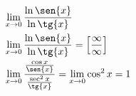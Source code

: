 \begin{ex}
\begin{align}
&\lim_{x\rightarrow 0} \frac{\ln{\sen{x}}}{\ln{\tg{x}}}\nonumber\\
&\lim_{x\rightarrow 0} \frac{\ln{\sen{x}}}{\ln{\tg{x}}}=\left[\frac{\infty}{\infty}\right]\nonumber\\
&\lim_{x\rightarrow 0} \frac{\frac{\cos{x}}{\sen{x}}}{\frac{\sec^2{x}}{\tg{x}}}=\lim_{x\rightarrow 0} \cos^2{x}=1\nonumber
\end{align}
\end{ex}
